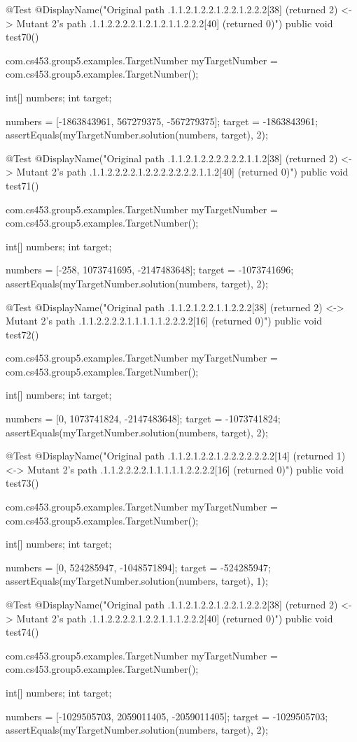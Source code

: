 @Test
@DisplayName("Original path .1.1.2.1.2.2.1.2.2.1.2.2.2[38] (returned 2) <-> Mutant 2's path .1.1.2.2.2.2.1.2.1.2.1.1.2.2.2[40] (returned 0)")
public void test70() {
    com.cs453.group5.examples.TargetNumber myTargetNumber = com.cs453.group5.examples.TargetNumber();

    int[] numbers;
    int target;

    numbers = [-1863843961, 567279375, -567279375];
    target = -1863843961;
    assertEquals(myTargetNumber.solution(numbers, target), 2);
}

@Test
@DisplayName("Original path .1.1.2.1.2.2.2.2.2.2.1.1.2[38] (returned 2) <-> Mutant 2's path .1.1.2.2.2.2.1.2.2.2.2.2.2.2.1.1.2[40] (returned 0)")
public void test71() {
    com.cs453.group5.examples.TargetNumber myTargetNumber = com.cs453.group5.examples.TargetNumber();

    int[] numbers;
    int target;

    numbers = [-258, 1073741695, -2147483648];
    target = -1073741696;
    assertEquals(myTargetNumber.solution(numbers, target), 2);
}

@Test
@DisplayName("Original path .1.1.2.1.2.2.1.1.2.2.2[38] (returned 2) <-> Mutant 2's path .1.1.2.2.2.2.1.1.1.1.1.2.2.2.2[16] (returned 0)")
public void test72() {
    com.cs453.group5.examples.TargetNumber myTargetNumber = com.cs453.group5.examples.TargetNumber();

    int[] numbers;
    int target;

    numbers = [0, 1073741824, -2147483648];
    target = -1073741824;
    assertEquals(myTargetNumber.solution(numbers, target), 2);
}

@Test
@DisplayName("Original path .1.1.2.1.2.2.1.2.2.2.2.2.2.2[14] (returned 1) <-> Mutant 2's path .1.1.2.2.2.2.1.1.1.1.1.2.2.2.2[16] (returned 0)")
public void test73() {
    com.cs453.group5.examples.TargetNumber myTargetNumber = com.cs453.group5.examples.TargetNumber();

    int[] numbers;
    int target;

    numbers = [0, 524285947, -1048571894];
    target = -524285947;
    assertEquals(myTargetNumber.solution(numbers, target), 1);
}

@Test
@DisplayName("Original path .1.1.2.1.2.2.1.2.2.1.2.2.2[38] (returned 2) <-> Mutant 2's path .1.1.2.2.2.2.1.2.2.1.1.1.2.2.2[40] (returned 0)")
public void test74() {
    com.cs453.group5.examples.TargetNumber myTargetNumber = com.cs453.group5.examples.TargetNumber();

    int[] numbers;
    int target;

    numbers = [-1029505703, 2059011405, -2059011405];
    target = -1029505703;
    assertEquals(myTargetNumber.solution(numbers, target), 2);
}

